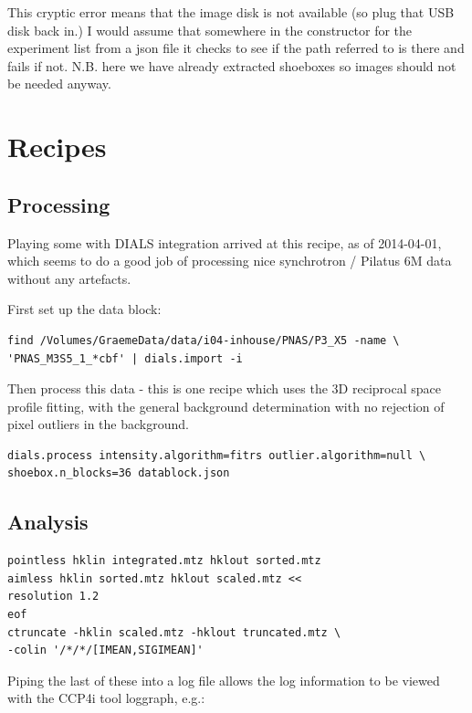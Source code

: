 \documentclass[a4paper, 11pt]{article}
\begin{document}
\noindent
This cryptic error means that the image disk is not available (so plug
that USB disk back in.) I would assume that somewhere in the
constructor for the experiment list from a json file it checks to see
if the path referred to is there and fails if not. N.B. here we have
already extracted shoeboxes so images should not be needed anyway.

\section{Recipes}

\subsection{Processing}

Playing some with DIALS integration arrived at this recipe, as of
2014-04-01, which seems to do a good job of processing nice
synchrotron / Pilatus 6M data without any artefacts.

First set up the data block:

{\small
\begin{verbatim}
find /Volumes/GraemeData/data/i04-inhouse/PNAS/P3_X5 -name \
'PNAS_M3S5_1_*cbf' | dials.import -i
\end{verbatim}
}

\noindent
Then process this data - this is one recipe which uses the 3D
reciprocal space profile fitting, with the general background
determination with no rejection of pixel outliers in the background.

{\small
\begin{verbatim}
dials.process intensity.algorithm=fitrs outlier.algorithm=null \
shoebox.n_blocks=36 datablock.json
\end{verbatim}
}

\subsection{Analysis}

{\small
\begin{verbatim}
pointless hklin integrated.mtz hklout sorted.mtz
aimless hklin sorted.mtz hklout scaled.mtz <<
resolution 1.2
eof
ctruncate -hklin scaled.mtz -hklout truncated.mtz \
-colin '/*/*/[IMEAN,SIGIMEAN]'
\end{verbatim}
}

Piping the last of these into a log file allows the log information to
be viewed with the CCP4i tool loggraph, e.g.:
\end{document}
